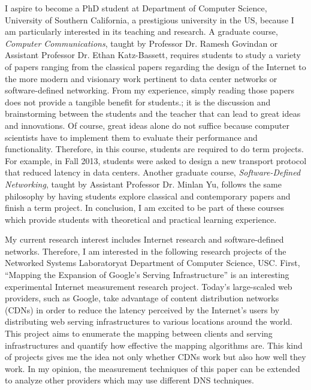 \documentclass[a4paper,10pt]{report}
\newcommand{\university}{University of Southern California}
\newcommand{\department}{Department of Computer Science}
\newcommand{\uniabbre}{USC}
\newcommand{\labfirst}{Networked Systems Laboratory}
\begin{document}
\vspace{0.2cm}
I aspire to become a PhD student at \department, \university, a prestigious university in the US, because I am particularly interested in its teaching and research. A graduate course, \textit{Computer Communications}, taught by Professor Dr. Ramesh Govindan or Assistant Professor Dr. Ethan Katz-Bassett, requires students to study a variety of papers ranging from the classical papers regarding the design of the Internet to the more modern and visionary work pertinent to data center networks or software-defined networking. From my experience, simply reading those papers does not provide a tangible benefit for students.; it is the discussion and brainstorming between the students and the teacher that can lead to great ideas and innovations. Of course, great ideas alone do not suffice because computer scientists have to implement them to evaluate their performance and functionality. Therefore, in this course, students are required to do term projects. For example, in Fall 2013, students were asked to design a new transport protocol that reduced latency in data centers. Another graduate course, \textit{Software-Defined Networking}, taught by Assistant Professor Dr. Minlan Yu, follows the same philosophy by having students explore classical and contemporary papers and finish a term project. In conclusion, I am excited to be part of these courses which provide students with theoretical and practical learning experience.

\vspace{0.2cm}
My current research interest includes Internet research and software-defined networks. Therefore, I am interested in the following research projects of the \labfirst \space at \department, \uniabbre. First, ``Mapping the Expansion of Google's Serving Infrastructure'' is an interesting experimental Internet measurement research project. Today's large-scaled web providers, such as Google, take advantage of content distribution networks (CDNs) in order to reduce the latency perceived by the Internet's users by distributing web serving infrastructures to various locations around the world. This project aims to enumerate the mapping between clients and serving infrastructures and quantify how effective the mapping algorithms are. This kind of projects gives me the idea not only whether CDNs work but also how well they work. In my opinion, the measurement techniques of this paper can be extended to analyze other providers which may use different DNS techniques.
\end{document}
